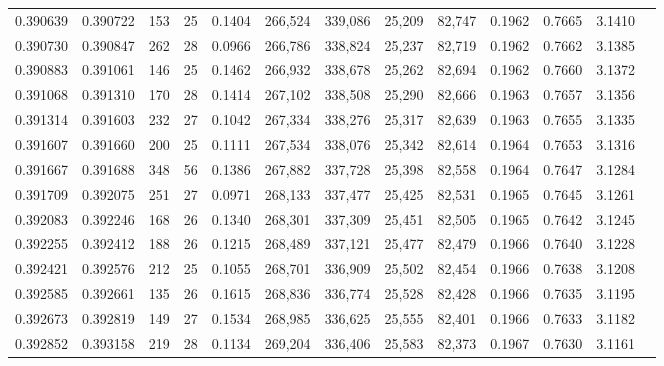 \begin{tabular}{rrrrrrrrrrrrr}
0.390639 & 0.390722 &    153 &    25 &                                     0.1404 & 266,524 & 339,086 &  25,209 &  82,747 & 0.1962 & 0.7665 & 3.1410 \\
0.390730 & 0.390847 &    262 &    28 &                                     0.0966 & 266,786 & 338,824 &  25,237 &  82,719 & 0.1962 & 0.7662 & 3.1385 \\
0.390883 & 0.391061 &    146 &    25 &                                     0.1462 & 266,932 & 338,678 &  25,262 &  82,694 & 0.1962 & 0.7660 & 3.1372 \\
0.391068 & 0.391310 &    170 &    28 &                                     0.1414 & 267,102 & 338,508 &  25,290 &  82,666 & 0.1963 & 0.7657 & 3.1356 \\
0.391314 & 0.391603 &    232 &    27 &                                     0.1042 & 267,334 & 338,276 &  25,317 &  82,639 & 0.1963 & 0.7655 & 3.1335 \\
0.391607 & 0.391660 &    200 &    25 &                                     0.1111 & 267,534 & 338,076 &  25,342 &  82,614 & 0.1964 & 0.7653 & 3.1316 \\
0.391667 & 0.391688 &    348 &    56 &                                     0.1386 & 267,882 & 337,728 &  25,398 &  82,558 & 0.1964 & 0.7647 & 3.1284 \\
0.391709 & 0.392075 &    251 &    27 &                                     0.0971 & 268,133 & 337,477 &  25,425 &  82,531 & 0.1965 & 0.7645 & 3.1261 \\
0.392083 & 0.392246 &    168 &    26 &                                     0.1340 & 268,301 & 337,309 &  25,451 &  82,505 & 0.1965 & 0.7642 & 3.1245 \\
0.392255 & 0.392412 &    188 &    26 &                                     0.1215 & 268,489 & 337,121 &  25,477 &  82,479 & 0.1966 & 0.7640 & 3.1228 \\
0.392421 & 0.392576 &    212 &    25 &                                     0.1055 & 268,701 & 336,909 &  25,502 &  82,454 & 0.1966 & 0.7638 & 3.1208 \\
0.392585 & 0.392661 &    135 &    26 &                                     0.1615 & 268,836 & 336,774 &  25,528 &  82,428 & 0.1966 & 0.7635 & 3.1195 \\
0.392673 & 0.392819 &    149 &    27 &                                     0.1534 & 268,985 & 336,625 &  25,555 &  82,401 & 0.1966 & 0.7633 & 3.1182 \\
0.392852 & 0.393158 &    219 &    28 &                                     0.1134 & 269,204 & 336,406 &  25,583 &  82,373 & 0.1967 & 0.7630 & 3.1161 \\

\end{tabular}
